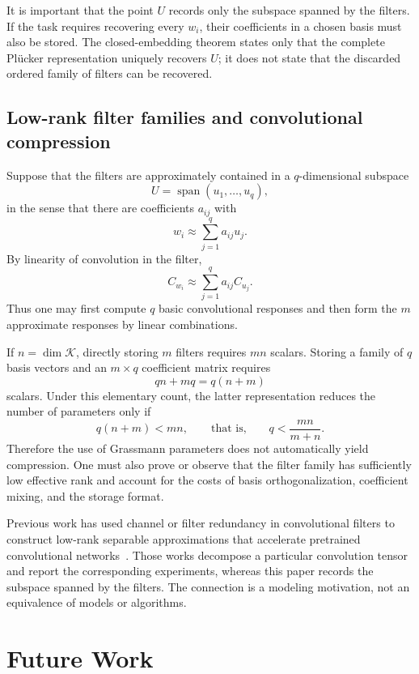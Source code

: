 \documentclass{siamonline250211}
\newcommand{\Span}{\operatorname{span}}
\newcommand{\cK}{\mathcal K}
\begin{document}
It is important that the point $U$ records only the subspace spanned by the
filters. If the task requires recovering every $w_i$, their coefficients in a
chosen basis must also be stored. The closed-embedding theorem states only that
the complete Pl\"ucker representation uniquely recovers $U$; it does not state
that the discarded ordered family of filters can be recovered.

\subsection{Low-rank filter families and convolutional compression}

Suppose that the filters are approximately contained in a $q$-dimensional
subspace
\[
  U=\Span(u_1,\ldots,u_q),
\]
in the sense that there are coefficients $a_{ij}$ with
\[
  w_i\approx\sum_{j=1}^q a_{ij}u_j.
\]
By linearity of convolution in the filter,
\[
  C_{w_i}
  \approx\sum_{j=1}^q a_{ij}C_{u_j}.
\]
Thus one may first compute $q$ basic convolutional responses and then form the
$m$ approximate responses by linear combinations.

If $n=\dim\cK$, directly storing $m$ filters requires $mn$ scalars. Storing a
family of $q$ basis vectors and an $m\times q$ coefficient matrix requires
\[
  qn+mq=q(n+m)
\]
scalars. Under this elementary count, the latter representation reduces the
number of parameters only if
\begin{equation}\label{eq:compression-threshold}
  q(n+m)<mn,
  \qquad\text{that is,}\qquad
  q<\frac{mn}{m+n}.
\end{equation}
Therefore the use of Grassmann parameters does not automatically yield
compression. One must also prove or observe that the filter family has
sufficiently low effective rank and account for the costs of basis
orthogonalization, coefficient mixing, and the storage format.

Previous work has used channel or filter redundancy in convolutional filters to
construct low-rank separable approximations that accelerate pretrained
convolutional networks~\cite{DZBLF14,JVZ14}. Those works decompose a particular
convolution tensor and report the corresponding experiments, whereas this paper
records the subspace spanned by the filters. The connection is a modeling
motivation, not an equivalence of models or algorithms.

\section{Future Work}
\end{document}
